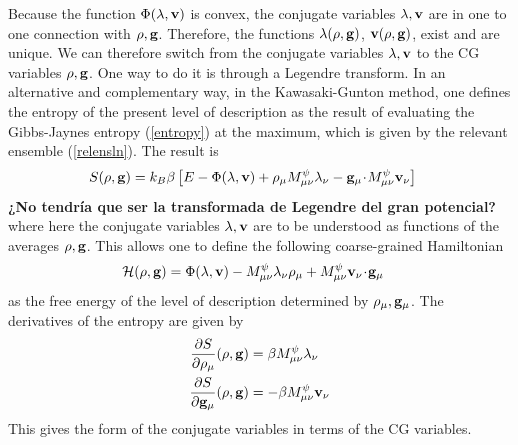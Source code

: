 \documentclass[b5paper,openright,11pt]{book}
\newcommand{\esc}{\!\cdot\!}
\newcommand{\Note}[1]{{\bf \color{red}#1}}    %
\begin{document}
\begin{appendices}
Because the function $ \Phi(\lambda,{\bf v})$ is convex, the conjugate
variables  $\lambda,{\bf  v}$  are  in  one  to  one  connection  with
$\rho,{\bf  g}$.  Therefore,  the  functions $\lambda(\rho,{\bf  g})$,
${\bf  v}(\rho,{\bf g})$,  exist  and are  unique.   We can  therefore
switch  from  the conjugate  variables  $\lambda,{\bf  v}$ to  the  CG
variables $\rho,{\bf  g}$.  One  way to  do it  is through  a Legendre
transform.   In   an  alternative   and  complementary  way,   in  the
Kawasaki-Gunton method, one  defines the entropy of  the present level
of description  as the result  of evaluating the  Gibbs-Jaynes entropy
(\ref{entropy}) at  the maximum, which  is given by  the relevant
ensemble (\ref{relensln}).  The result is
\begin{align}
  S(\rho,{\bf g}) &=k_B\beta\left[E-\Phi(\lambda,{\bf v})
+\rho_\mu M^\psi_{\mu\nu}\lambda_\nu-{\bf g}_\mu\esc M^\psi_{\mu\nu}{\bf v}_\nu\right]
\label{entropy2}
\end{align}
\Note{¿No tendría que ser la transformada de Legendre del gran potencial?}
where  here  the  conjugate  variables $\lambda,{\bf  v}$  are  to  be
understood as functions  of the averages $\rho,{\bf  g}$.  This allows one
to define  the following coarse-grained Hamiltonian
\begin{align}
  {\cal H}(\rho,{\bf g}) &=\Phi(\lambda,{\bf v})
 - M^\psi_{\mu\nu}\lambda_\nu \rho_\mu+M^\psi_{\mu\nu}{\bf v}_\nu\esc {\bf g}_\mu
\label{oleg}
\end{align}
as  the  free  energy  of  the  level  of  description  determined  by
$\rho_\mu,{\bf g}_\mu$. The derivatives of the entropy are given by
\begin{align}
\frac{\partial S}{\partial \rho_\mu} (\rho,{\bf g}) &=\beta M^\psi_{\mu\nu}\lambda_\nu
\nonumber\\
\frac{\partial S}{\partial {\bf g}_\mu} (\rho,{\bf g}) &=- \beta M^\psi_{\mu\nu}{\bf v}_\nu
\label{derS}
\end{align}
This gives the form of the conjugate variables in terms of the CG variables.

\end{appendices}
\end{document}
